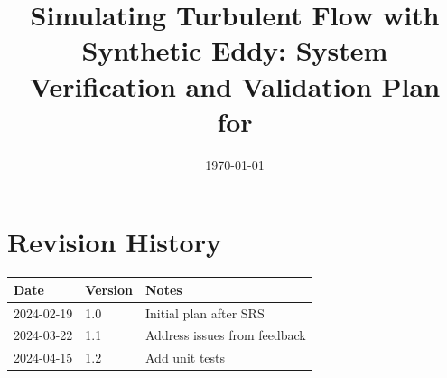 \documentclass[12pt, titlepage]{article}
\begin{document}
\title{Simulating Turbulent Flow with Synthetic Eddy: System Verification and Validation Plan for \progname{}}
\author{\authname}
\date{\today}
	
\maketitle


\section*{Revision History}

\begin{tabularx}{\textwidth}{p{3cm}p{2cm}X}
\toprule {\bf Date} & {\bf Version} & {\bf Notes}\\
\midrule
2024-02-19 & 1.0 & Initial plan after SRS\\
2024-03-22 & 1.1 & Address issues from feedback\\
2024-04-15 & 1.2 & Add unit tests\\
\bottomrule
\end{tabularx}



\newpage

\tableofcontents

\listoftables

\listoffigures

\newpage
\end{document}
